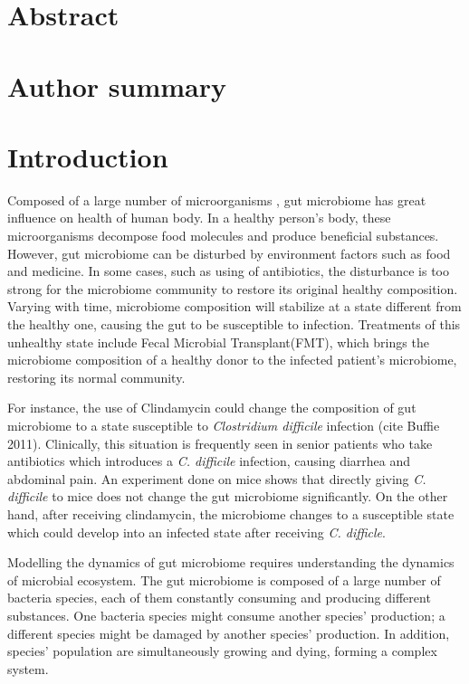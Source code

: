 \documentclass[10pt,letterpaper]{article}
\begin{document}
\section*{Abstract}



\section*{Author summary}


\linenumbers

\section*{Introduction}

	Composed of a large number of microorganisms , gut microbiome has great influence on health of human body. In a healthy person's body, these microorganisms decompose food molecules and produce beneficial substances. However, gut microbiome can be disturbed by environment factors such as food and medicine. In some cases, such as using of antibiotics, the disturbance is too strong for the microbiome community to restore its original healthy composition. Varying with time, microbiome composition will stabilize at a state different from the healthy one, causing the gut to be susceptible to infection. Treatments of this unhealthy state include Fecal Microbial Transplant(FMT), which brings the microbiome composition of a healthy donor to the infected patient's microbiome, restoring its normal community.  
	
For instance, the use of Clindamycin could change the composition of gut microbiome to a state susceptible to \textit{Clostridium difficile} infection (cite Buffie 2011). Clinically, this situation is frequently seen in senior patients who take antibiotics which introduces a \textit{C. difficile} infection, causing diarrhea and abdominal pain. An experiment done on mice shows that directly giving \textit{C. difficile} to mice does not change the gut microbiome significantly. On the other hand, after receiving clindamycin, the microbiome changes to a susceptible state which could develop into an infected state after receiving \textit{C. difficle}. 
	
Modelling the dynamics of gut microbiome requires understanding the dynamics of microbial ecosystem. The gut microbiome is composed of a large number of bacteria species, each of them constantly consuming and producing different substances. One bacteria species might consume another species' production; a different species might be damaged by another species' production. In addition, species' population are simultaneously growing and dying, forming a complex system. 
\end{document}
